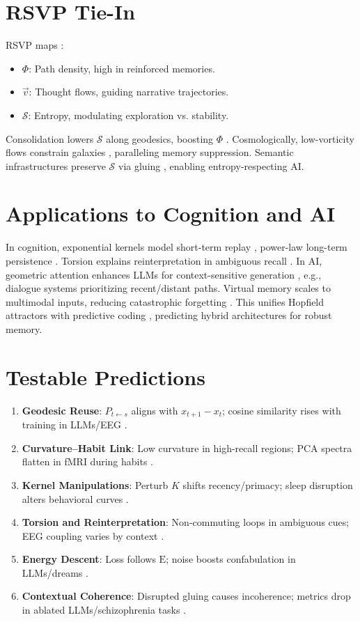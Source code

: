 \documentclass[a4paper,12pt]{article}
\newcommand{\E}{\mathrm{E}}
\newcommand{\Scal}{\mathcal{S}}
\newcommand{\vvec}{\vec{v}}
\begin{document}
\section{RSVP Tie-In}
RSVP maps \citep{semantic2025}:
\begin{itemize}
    \item $\Phi$: Path density, high in reinforced memories.
    \item $\vvec$: Thought flows, guiding narrative trajectories.
    \item $\Scal$: Entropy, modulating exploration vs. stability.
\end{itemize}
Consolidation lowers $\Scal$ along geodesics, boosting $\Phi$ \citep{mcclelland1995why}. Cosmologically, low-vorticity flows constrain galaxies \citep{weinberg2008cosmology}, paralleling memory suppression. Semantic infrastructures preserve $\Scal$ via gluing \citep{lurie2009higher}, enabling entropy-respecting AI.

\section{Applications to Cognition and AI}
In cognition, exponential kernels model short-term replay \citep{hassabis2007patients}, power-law long-term persistence \citep{mcclelland1995why}. Torsion explains reinterpretation in ambiguous recall \citep{stickgold2005sleep}. In AI, geometric attention enhances LLMs for context-sensitive generation \citep{vaswani2017attention}, e.g., dialogue systems prioritizing recent/distant paths. Virtual memory scales to multimodal inputs, reducing catastrophic forgetting \citep{kirkpatrick2017overcoming}. This unifies Hopfield attractors \citep{hopfield1982neural} with predictive coding \citep{friston2010free}, predicting hybrid architectures for robust memory.

\section{Testable Predictions}
\begin{enumerate}
    \item \textbf{Geodesic Reuse}: $P_{t \leftarrow s}$ aligns with $x_{t+1} - x_t$; cosine similarity rises with training in LLMs/EEG \citep{oliver2017hippocampal}.
    \item \textbf{Curvature–Habit Link}: Low curvature in high-recall regions; PCA spectra flatten in fMRI during habits \citep{hassabis2007patients}.
    \item \textbf{Kernel Manipulations}: Perturb $K$ shifts recency/primacy; sleep disruption alters behavioral curves \citep{stickgold2005sleep}.
    \item \textbf{Torsion and Reinterpretation}: Non-commuting loops in ambiguous cues; EEG coupling varies by context \citep{amari1977dynamics}.
    \item \textbf{Energy Descent}: Loss follows $\E$; noise boosts confabulation in LLMs/dreams \citep{friston2010free}.
    \item \textbf{Contextual Coherence}: Disrupted gluing causes incoherence; metrics drop in ablated LLMs/schizophrenia tasks \citep{edelman1998representation}.
\end{enumerate}
\end{document}
